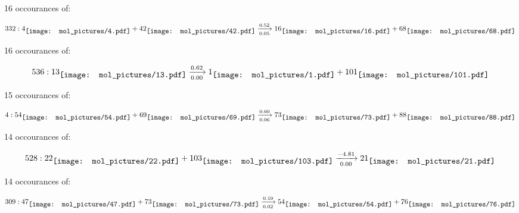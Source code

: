 \documentclass{article}
\begin{document}
\vspace{1cm}


16 occourances of:

$$
332:  
4
\raisebox{-.5\height}{\texttt{[image: mol\_pictures/4.pdf]}}
+
42
\raisebox{-.5\height}{\texttt{[image: mol\_pictures/42.pdf]}}
\xrightarrow[0.05]{0.52}
16
\raisebox{-.5\height}{\texttt{[image: mol\_pictures/16.pdf]}}
+
68
\raisebox{-.5\height}{\texttt{[image: mol\_pictures/68.pdf]}}
$$



\vspace{1cm}


16 occourances of:

$$
536:  
13
\raisebox{-.5\height}{\texttt{[image: mol\_pictures/13.pdf]}}
\xrightarrow[0.00]{0.62}
1
\raisebox{-.5\height}{\texttt{[image: mol\_pictures/1.pdf]}}
+
101
\raisebox{-.5\height}{\texttt{[image: mol\_pictures/101.pdf]}}
$$



\vspace{1cm}


15 occourances of:

$$
4:  
54
\raisebox{-.5\height}{\texttt{[image: mol\_pictures/54.pdf]}}
+
69
\raisebox{-.5\height}{\texttt{[image: mol\_pictures/69.pdf]}}
\xrightarrow[0.06]{0.60}
73
\raisebox{-.5\height}{\texttt{[image: mol\_pictures/73.pdf]}}
+
88
\raisebox{-.5\height}{\texttt{[image: mol\_pictures/88.pdf]}}
$$



\vspace{1cm}


14 occourances of:

$$
528:  
22
\raisebox{-.5\height}{\texttt{[image: mol\_pictures/22.pdf]}}
+
103
\raisebox{-.5\height}{\texttt{[image: mol\_pictures/103.pdf]}}
\xrightarrow[0.00]{-4.81}
21
\raisebox{-.5\height}{\texttt{[image: mol\_pictures/21.pdf]}}
$$



\vspace{1cm}


14 occourances of:

$$
309:  
47
\raisebox{-.5\height}{\texttt{[image: mol\_pictures/47.pdf]}}
+
73
\raisebox{-.5\height}{\texttt{[image: mol\_pictures/73.pdf]}}
\xrightarrow[0.02]{0.19}
54
\raisebox{-.5\height}{\texttt{[image: mol\_pictures/54.pdf]}}
+
76
\raisebox{-.5\height}{\texttt{[image: mol\_pictures/76.pdf]}}
$$
\end{document}
